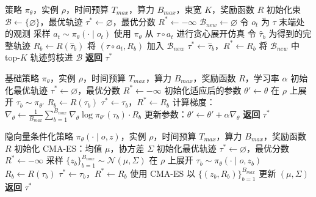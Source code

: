 \documentclass[11pt,UTF8,fontset=fandol]{ctexart}
\begin{document}
\begin{algorithm}[H]
\caption{Simulation-Guided Beam Search（仿真引导束搜索）}
\label{alg:2}
\begin{algorithmic}[1]
\Require 策略 $\pi_\theta$，实例 $\rho$，时间预算 $T_{max}$，算力 $B_{max}$，束宽 $K$，奖励函数 $R$
\State 初始化束 $\mathcal{B} \gets \{\varnothing\}$，最优轨迹 $\tau^* \gets \varnothing$，最优分数 $R^* \gets -\infty$
  \State $\mathcal{B}_{new} \gets \varnothing$
      \State 令 $o_t$ 为 $\tau$ 末端处的观测
      \State 采样 $a_t \sim \pi_\theta(\cdot \mid o_t)$
      \State 使用 $\pi_\theta$ 从 $\tau \circ a_t$ 进行贪心展开仿真
      \State 令 $\hat\tau_b$ 为得到的完整轨迹
      \State $R_b \gets R(\hat\tau_b)$
      \State 将 $(\tau \circ a_t, R_b)$ 加入 $\mathcal{B}_{new}$
        \State $\tau^* \gets \hat\tau_b$，$R^* \gets R_b$
      \EndIf
    \EndFor
  \EndFor
  \State 将 $\mathcal{B}_{new}$ 中 top-$K$ 轨迹剪枝进 $\mathcal{B}$
\EndWhile
\State \textbf{返回} $\tau^*$
\end{algorithmic}
\end{algorithm}

\begin{algorithm}[H]
\caption{Online Fine-Tuning（在线微调）}
\label{alg:3}
\begin{algorithmic}[1]
\Require 基础策略 $\pi_\theta$，实例 $\rho$，时间预算 $T_{max}$，算力 $B_{max}$，奖励函数 $R$，学习率 $\alpha$
\State 初始化最优轨迹 $\tau^* \gets \varnothing$，最优分数 $R^* \gets -\infty$
\State 初始化适应后的参数 $\theta' \gets \theta$
    \State 在 $\rho$ 上展开 $\tau_b \sim \pi_{\theta'}$
    \State $R_b \gets R(\tau_b)$
      \State $\tau^* \gets \tau_b$，$R^* \gets R_b$
    \EndIf
  \EndFor
  \State 计算梯度：$\nabla_\theta \gets \frac{1}{B_{max}} \sum_{b=1}^{B_{max}} \nabla_\theta \log \pi_{\theta'}(\tau_b) \cdot R_b$
  \State 更新参数：$\theta' \gets \theta' + \alpha \nabla_\theta$
\EndWhile
\State \textbf{返回} $\tau^*$
\end{algorithmic}
\end{algorithm}

\begin{algorithm}[H]
\caption{COMPASS + CMA-ES search（COMPASS + CMA-ES 搜索）}
\label{alg:4}
\begin{algorithmic}[1]
\Require 隐向量条件化策略 $\pi_\theta(\cdot \mid o, z)$，实例 $\rho$，时间预算 $T_{max}$，算力 $B_{max}$，奖励函数 $R$
\State 初始化 CMA-ES：均值 $\mu$，协方差 $\Sigma$
\State 初始化最优轨迹 $\tau^* \gets \varnothing$，最优分数 $R^* \gets -\infty$
  \State 采样 $\{z_b\}_{b=1}^{B_{max}} \sim \mathcal{N}(\mu, \Sigma)$
    \State 在 $\rho$ 上展开 $\tau_b \sim \pi_\theta(\cdot \mid o, z_b)$
    \State $R_b \gets R(\tau_b)$
      \State $\tau^* \gets \tau_b$，$R^* \gets R_b$
    \EndIf
  \EndFor
  \State 使用 CMA-ES 以 $\{(z_b, R_b)\}_{b=1}^{B_{max}}$ 更新 $(\mu, \Sigma)$
\EndWhile
\State \textbf{返回} $\tau^*$
\end{algorithmic}
\end{algorithm}
\end{document}
